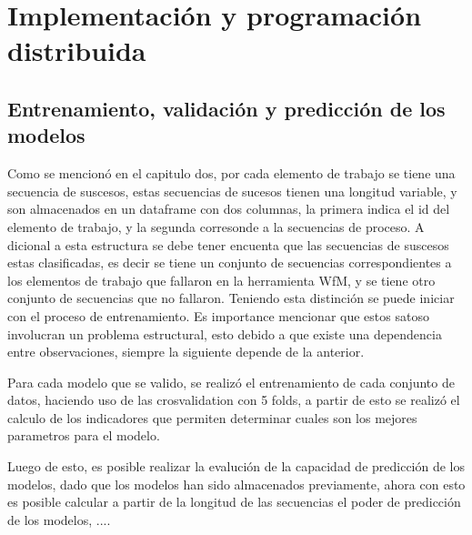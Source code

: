
\chapter{Implementación y programación distribuida}

\ifpdf
    \graphicspath{{Chapter4/Figs/Raster/}{Chapter4/Figs/PDF/}{Chapter4/Figs/}}
\else
    \graphicspath{{Chapter4/Figs/Vector/}{Chapter4/Figs/}}
\fi


\section{Entrenamiento, validación y predicción de los modelos} %
\label{section4.1}

Como se mencionó en el capitulo dos, por cada elemento de trabajo se tiene una secuencia de suscesos, estas secuencias de sucesos tienen una longitud variable, y son almacenados en un dataframe con dos columnas, la primera indica el id del elemento de trabajo, y la segunda corresonde a la secuencias de proceso. A dicional a esta estructura se debe tener encuenta que las secuencias de suscesos estas clasificadas, es decir se tiene un conjunto de secuencias correspondientes a los elementos de trabajo que fallaron en la herramienta WfM, y se tiene otro conjunto de secuencias que no fallaron. Teniendo esta distinción se puede iniciar con el proceso de entrenamiento. Es importance mencionar que estos satoso involucran un problema estructural, esto debido a que existe una dependencia entre observaciones, siempre la siguiente depende de la anterior.

Para cada modelo que se valido, se realizó el entrenamiento de cada conjunto de datos, haciendo uso de las crosvalidation con 5 folds, a partir de esto se realizó el calculo de los indicadores que permiten determinar cuales son los mejores parametros para el modelo.

Luego de esto, es posible realizar la evalución de la capacidad de predicción de los modelos, dado que los modelos han sido almacenados previamente, ahora con esto es posible calcular a partir de la longitud de las secuencias el poder de predicción de los modelos, ....

